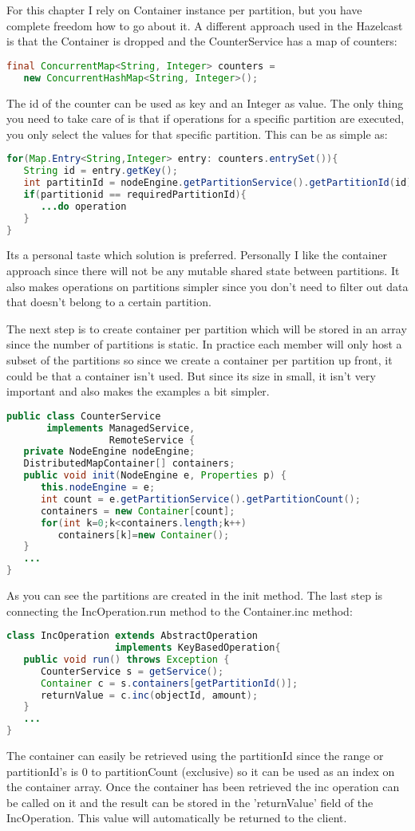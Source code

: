 For this chapter I rely on Container instance per partition, but you have complete freedom how to go about it. A different approach used in the Hazelcast is that the Container is dropped and the CounterService has a map of counters:
\begin{lstlisting}[language=java]
final ConcurrentMap<String, Integer> counters = 
   new ConcurrentHashMap<String, Integer>();
\end{lstlisting}
The id of the counter can be used as key and an Integer as value. The only thing you need to take care of is that if operations for a specific partition are executed, you only select the values for that specific partition. This can be as simple as: 
\begin{lstlisting}[language=java]
for(Map.Entry<String,Integer> entry: counters.entrySet()){
   String id = entry.getKey();
   int partitinId = nodeEngine.getPartitionService().getPartitionId(id); 
   if(partitionid == requiredPartitionId){
      ...do operation	
   }
}
\end{lstlisting}
Its a personal taste which solution is preferred. Personally I like the container approach since there will not be any mutable shared state between partitions. It also makes operations on partitions simpler since you don't need to filter out data that doesn't belong to a certain partition.

The next step is to create container per partition which will be stored in an array since the number of partitions is static. In practice each member will only host a subset of the partitions so since we create a container per partition up front, it could be that a container isn't used. But since its size in small, it isn't very important and also makes the examples a bit simpler.
\begin{lstlisting}[language=java]
public class CounterService 
       implements ManagedService, 
                  RemoteService {
   private NodeEngine nodeEngine;
   DistributedMapContainer[] containers;
   public void init(NodeEngine e, Properties p) {
      this.nodeEngine = e;
      int count = e.getPartitionService().getPartitionCount();
      containers = new Container[count];
      for(int k=0;k<containers.length;k++) 
         containers[k]=new Container();
   }
   ...
}
\end{lstlisting}
As you can see the partitions are created in the init method. The last step is connecting the IncOperation.run method to the Container.inc method:
\begin{lstlisting}[language=java]
class IncOperation extends AbstractOperation 
                   implements KeyBasedOperation{  
   public void run() throws Exception {
      CounterService s = getService();
      Container c = s.containers[getPartitionId()];
      returnValue = c.inc(objectId, amount);
   }
   ...  
}
\end{lstlisting}
The container can easily be retrieved using the partitionId since the range or partitionId's is 0 to partitionCount (exclusive) so it can be used as an index on the container array. Once the container has been retrieved the inc operation can be called on it and the result can be stored in the 'returnValue' field of the IncOperation. This value will automatically be returned to the client.

